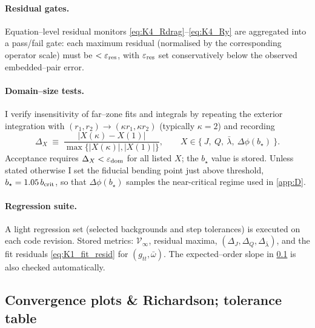 \documentclass{iopjournal}
\begin{document}
\paragraph{Residual gates.}
Equation–level residual monitors \eqref{eq:K4_Rdrag}–\eqref{eq:K4_Ry} are aggregated into a pass/fail gate: each maximum residual (normalised by the corresponding operator scale) must be $<\varepsilon_{\rm res}$, with $\varepsilon_{\rm res}$ set conservatively below the observed embedded–pair error.

\paragraph{Domain–size tests.}
I verify insensitivity of far–zone fits and integrals by repeating the exterior integration with $(r_1,r_2)\to(\kappa r_1,\kappa r_2)$ (typically $\kappa=2$) and recording
\[
\Delta_X\;\equiv\;\frac{|X(\kappa)-X(1)|}{\max\{|X(\kappa)|,|X(1)|\}},
\qquad X\in\{\ J,\ Q,\ \bar\lambda,\ \Delta\phi(b_\star)\ \}.
\]
Acceptance requires $\Delta_X<\varepsilon_{\rm dom}$ for all listed $X$; the $b_\star$ value is stored. Unless stated otherwise I set the fiducial bending point just above threshold, $b_\star=1.05\,b_{\rm crit}$, so that $\Delta\phi(b_\star)$ samples the near-critical regime used in \cref{app:D}.


\paragraph{Regression suite.}
A light regression set (selected backgrounds and step tolerances) is executed on each code revision. Stored metrics: $\mathcal V_{\infty}$, residual maxima, $(\Delta_J,\Delta_Q,\Delta_{\bar\lambda})$, and the fit residuals \eqref{eq:K1_fit_resid} for $(g_{tt},\bar\omega)$. The expected–order slope in \cref{app:K6} is also checked automatically.

\subsection{Convergence plots \& Richardson; tolerance table}\label{app:K6}
\end{document}
